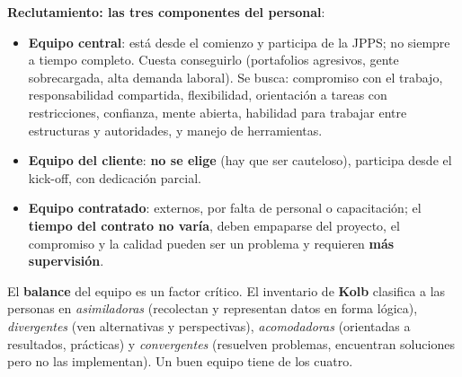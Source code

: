 \documentclass[11pt,a4paper]{article}
\begin{document}
\textbf{Reclutamiento: las tres componentes del personal}:
\begin{itemize}
  \item \textbf{Equipo central}: está desde el comienzo y participa de la JPPS; no siempre a tiempo completo.
  Cuesta conseguirlo (portafolios agresivos, gente sobrecargada, alta demanda laboral). Se busca:
  compromiso con el trabajo, responsabilidad compartida, flexibilidad, orientación a tareas con restricciones,
  confianza, mente abierta, habilidad para trabajar entre estructuras y autoridades, y manejo de herramientas.
  \item \textbf{Equipo del cliente}: \textbf{no se elige} (hay que ser cauteloso), participa desde el kick-off,
  con dedicación parcial.
  \item \textbf{Equipo contratado}: externos, por falta de personal o capacitación; el \textbf{tiempo del
  contrato no varía}, deben empaparse del proyecto, el compromiso y la calidad pueden ser un problema y
  requieren \textbf{más supervisión}.
\end{itemize}
El \textbf{balance} del equipo es un factor crítico. El inventario de \textbf{Kolb} clasifica a las personas en
\emph{asimiladoras} (recolectan y representan datos en forma lógica), \emph{divergentes} (ven alternativas y
perspectivas), \emph{acomodadoras} (orientadas a resultados, prácticas) y \emph{convergentes} (resuelven
problemas, encuentran soluciones pero no las implementan). Un buen equipo tiene de los cuatro.
\end{document}
